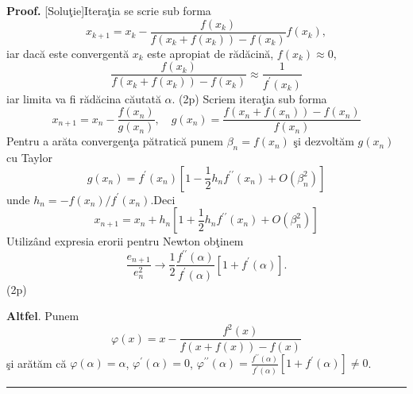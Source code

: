 \documentclass{article}%
\newenvironment{proof}[1][Proof]{\noindent\textbf{#1.} }{\ \rule{0.5em}{0.5em}}
\begin{document}
\begin{proof}
[Solu\c{t}ie]Itera\c{t}ia se scrie sub forma%
\[
x_{k+1}=x_{k}-\frac{f(x_{k})}{f\left(  x_{k}+f(x_{k})\right)  -f(x_{k}%
)}f(x_{k}),
\]
iar dac\u{a} este convergent\u{a} $x_{k}$ este apropiat de
r\u{a}d\u{a}cin\u{a}, $f(x_{k})\approx0$,
\[
\frac{f(x_{k})}{f\left(  x_{k}+f(x_{k})\right)  -f(x_{k})}\approx\frac
{1}{f^{\prime}(x_{k})}%
\]
iar limita va fi r\u{a}d\u{a}cina c\u{a}utat\u{a} $\alpha$. (2p) Scriem
itera\c{t}ia sub forma%
\[
x_{n+1}=x_{n}-\frac{f(x_{n})}{g(x_{n})},\quad g(x_{n})=\frac{f\left(
x_{n}+f(x_{n})\right)  -f(x_{n})}{f(x_{n})}%
\]
Pentru a ar\u{a}ta convergen\c{t}a p\u{a}tratic\u{a} punem $\beta_{n}%
=f(x_{n})$ \c{s}i dezvolt\u{a}m $g(x_{n})$ cu Taylor%
\[
g(x_{n})=f^{\prime}(x_{n})\left[  1-\frac{1}{2}h_{n}f^{\prime\prime}%
(x_{n})+O\left(  \beta_{n}^{2}\right)  \right]
\]
unde $h_{n}=-f(x_{n})/f^{\prime}(x_{n})$.Deci%
\[
x_{n+1}=x_{n}+h_{n}\left[  1+\frac{1}{2}h_{n}f^{\prime\prime}(x_{n})+O\left(
\beta_{n}^{2}\right)  \right]
\]
Utiliz\^{a}nd expresia erorii pentru Newton ob\c{t}inem%
\[
\frac{e_{n+1}}{e_{n}^{2}}\rightarrow\frac{1}{2}\frac{f^{\prime\prime}(\alpha
)}{f^{\prime}(\alpha)}\left[  1+f^{\prime}(\alpha)\right]  .
\]
(2p)

\textbf{Altfel}. Punem%
\[
\varphi(x)=x-\frac{f^{2}(x)}{f(x+f(x))-f(x)}%
\]
\c{s}i ar\u{a}t\u{a}m c\u{a} $\varphi(\alpha)=\alpha$, $\varphi^{\prime
}(\alpha)=0$, $\varphi^{\prime\prime}(\alpha)=\frac{f^{\prime\prime}(\alpha
)}{f^{\prime}(\alpha)}\left[  1+f^{\prime}(\alpha)\right]  \neq0$.
\end{proof}
\end{document}
